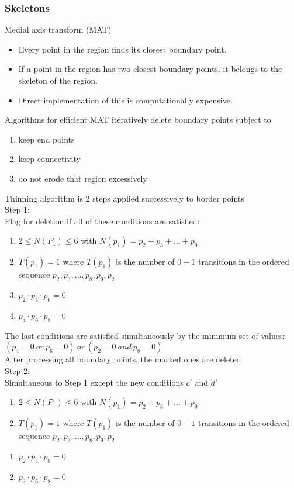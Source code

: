 \subsubsection{Skeletons}
Medial axis transform (MAT)
\begin{itemize}
\item Every point in the region finds its closest boundary point.
\item If a point in the region has two closest boundary points, it belongs to the skeleton of the region.
\item Direct implementation of this is computationally expensive.
\end{itemize}
Algorithms for efficient MAT iteratively delete boundary points subject to
\begin{enumerate}
\item keep end points
\item keep connectivity
\item do not erode that region excessively
\end{enumerate}
Thinning algorithm is 2 steps applied successively to border points\\
Step 1:\\
Flag for deletion if all of these conditions are satisfied:
\begin{enumerate}[label={\alph*)}]
\item $2\leq N(P_1)\leq 6$ with $N(p_1)=p_2 + p_3 + \ldots + p_9$
\item $T(p_1)=1$ where $T(p_1)$ is the number of $0-1$ transitions in the ordered sequence $p_2,p_3,\ldots ,p_8,p_9,p_2$
\item $p_2 \cdot p_4 \cdot p_6 = 0$
\item $p_4 \cdot p_6 \cdot p_8 = 0$
\end{enumerate}
The last conditions are satisfied simultaneously by the minimum set of values: $(p_4=0\ or\ p_6=0)\ or \ (p_2=0\ and \ p_8=0)$\\
After processing all boundary points, the marked ones are deleted\\
Step 2:\\
Simultaneous to Step 1 except the new conditions $c'$ and $d'$\\
\begin{enumerate}[label={\alph*)}]
\item $2\leq N(P_1)\leq 6$ with $N(p_1)=p_2 + p_3 + \ldots + p_9$
\item $T(p_1)=1$ where $T(p_1)$ is the number of $0-1$ transitions in the ordered sequence $p_2,p_3,\ldots ,p_8,p_9,p_2$
\end{enumerate}
\begin{enumerate}[label={\alph*')},resume]
\item $p_2 \cdot p_4 \cdot p_8 = 0$
\item $p_2 \cdot p_6 \cdot p_8 = 0$
\end{enumerate}


